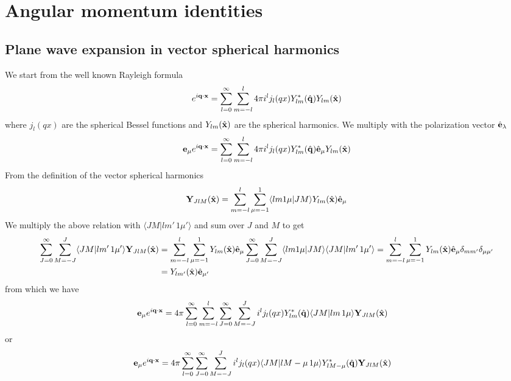 \appendix
\chapter{Angular momentum identities}

\section{Plane wave expansion in vector spherical harmonics}

We start from the well known Rayleigh formula
\begin{align}
    e^{i{\bf q}\cdot{\bf x}} = \sum\limits_{l=0}^{\infty} \sum_{m=-l}^{l} 4\pi i^l j_l(qx) Y_{lm}^*(\hat{\bf q}) Y_{lm}(\hat{\bf x})
\end{align}
where \(j_l(qx)\) are the spherical Bessel functions and \(Y_{lm}(\hat{\bf x})\) are the spherical harmonics.
We multiply with the polarization vector \(\hat{\bf e}_\lambda\)
\begin{align}
    {\bf e}_\mu e^{i{\bf q}\cdot{\bf x}} = \sum\limits_{l=0}^{\infty} \sum_{m=-l}^{l} 4\pi i^l j_l(qx) Y_{lm}^*(\hat{\bf q}) \hat{\bf e}_\mu Y_{lm}(\hat{\bf x})
\end{align}
From the definition of the vector spherical harmonics
\begin{align}
    {\bf Y}_{JlM}(\hat{\bf x}) = \sum\limits_{m=-l}^{l} \sum_{\mu=-1}^{1} \langle l m 1 \mu | J M \rangle Y_{lm}(\hat{\bf x}) \hat{\bf e}_\mu
\end{align}
We multiply the above relation with $\langle JM|lm'\,1\mu'\rangle$ and sum over $J$ and $M$ to get
\begin{align}
    \sum\limits_{J=0}^{\infty} \sum_{M=-J}^{J} \langle JM|lm'\,1\mu'\rangle {\bf Y}_{JlM}(\hat{\bf x}) & = \sum\limits_{m=-l}^{l} \sum_{\mu=-1}^{1} Y_{lm}(\hat{\bf x}) \hat{\bf e}_\mu \sum\limits_{J=0}^{\infty} \sum_{M=-J}^{J} \langle l m 1 \mu | J M \rangle\langle JM|lm'\,1\mu'\rangle= \sum\limits_{m=-l}^{l} \sum_{\mu=-1}^{1} Y_{lm}(\hat{\bf x}) \hat{\bf e}_\mu \delta_{mm'}\delta_{\mu\mu'}\nonumber \\
                                                                                                       & = Y_{lm'}(\hat{\bf x}) \hat{\bf e}_{\mu'}
\end{align}
from which we have
\begin{align}
    {\bf e}_\mu e^{i{\bf q}\cdot{\bf x}} & =4\pi \sum\limits_{l=0}^{\infty} \sum\limits_{m=-l}^{l} \sum\limits_{J=0}^{\infty} \sum_{M=-J}^{J}  i^l j_l(qx) Y_{lm}^*(\hat{\bf q}) \langle JM|lm\,1\mu\rangle {\bf Y}_{JlM}(\hat{\bf x})
\end{align}
or
\begin{align}
    {\bf e}_\mu e^{i{\bf q}\cdot{\bf x}} & =4\pi \sum\limits_{l=0}^{\infty}  \sum\limits_{J=0}^{\infty} \sum_{M=-J}^{J}  i^l j_l(qx)  \langle JM|lM-\mu\,1\mu\rangle Y_{lM-\mu}^*(\hat{\bf q}){\bf Y}_{JlM}(\hat{\bf x})\label{pwexpansion}
\end{align}


















